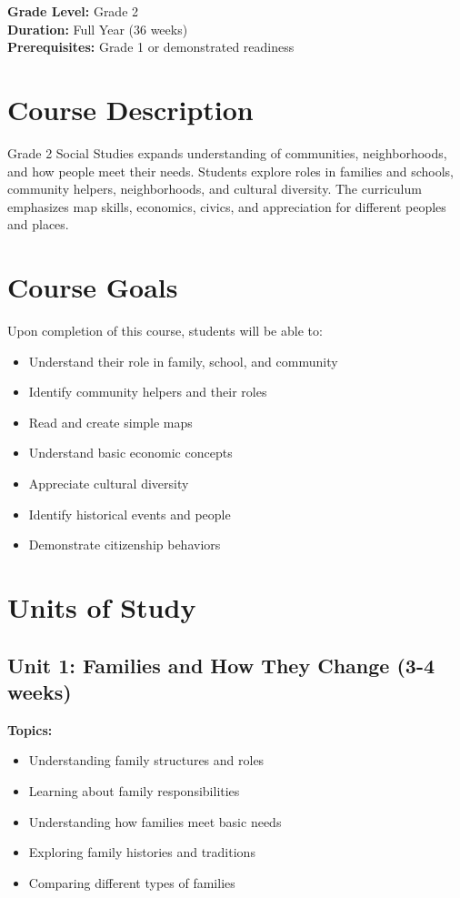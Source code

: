 \documentclass[11pt,letterpaper]{report}
\begin{document}
\textbf{Grade Level:} Grade 2\\
\textbf{Duration:} Full Year (36 weeks)\\
\textbf{Prerequisites:} Grade 1 or demonstrated readiness

\section{Course Description}

Grade 2 Social Studies expands understanding of communities, neighborhoods, and how people meet their needs. Students explore roles in families and schools, community helpers, neighborhoods, and cultural diversity. The curriculum emphasizes map skills, economics, civics, and appreciation for different peoples and places.

\section{Course Goals}

Upon completion of this course, students will be able to:

\begin{itemize}
    \item Understand their role in family, school, and community
    \item Identify community helpers and their roles
    \item Read and create simple maps
    \item Understand basic economic concepts
    \item Appreciate cultural diversity
    \item Identify historical events and people
    \item Demonstrate citizenship behaviors
\end{itemize}

\section{Units of Study}

\subsection{Unit 1: Families and How They Change (3-4 weeks)}

\textbf{Topics:}
\begin{itemize}
    \item Understanding family structures and roles
    \item Learning about family responsibilities
    \item Understanding how families meet basic needs
    \item Exploring family histories and traditions
    \item Comparing different types of families
\end{itemize}
\end{document}
